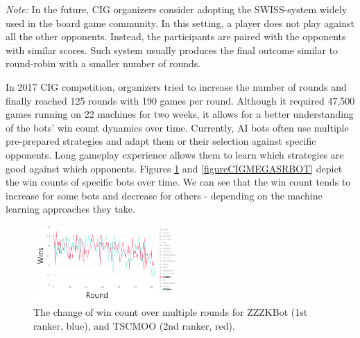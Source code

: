 {\em Note:} In the future, CIG organizers consider adopting the SWISS-system widely used in the board game community. In this setting, a player does not play against all the other opponents. Instead, the participants are paired with the opponents with similar scores. Such system usually produces the final outcome similar to round-robin with a smaller number of rounds. 

In 2017 CIG competition, organizers tried to increase the number of rounds and finally reached 125 rounds with 190 games per round. Although it required 47,500 games running on 22 machines for two weeks, it allows for a better understanding of the bots' win count dynamics over time. Currently, AI bots often use multiple pre-prepared strategies and adapt them or their selection against specific opponents. Long gameplay experience allows them to learn which strategies are good against which opponents. 
Figures \ref{figureCIGZZZTSCMOO} and \ref{figureCIGMEGASRBOT} depict the win counts of specific bots over time. We can see that the win count tends to increase for some bots and decrease for others - depending on the machine learning approaches they take. 

\begin{figure}[h]
  \centering
  \includegraphics[width=0.5\textwidth]{fig/cig-tscmoo-zzzkbot-winrate.png}
  \caption{The change of win count over multiple rounds for ZZZKBot (1st ranker, blue), and TSCMOO (2nd ranker, red).}
  \label{figureCIGZZZTSCMOO}
\end{figure} 

